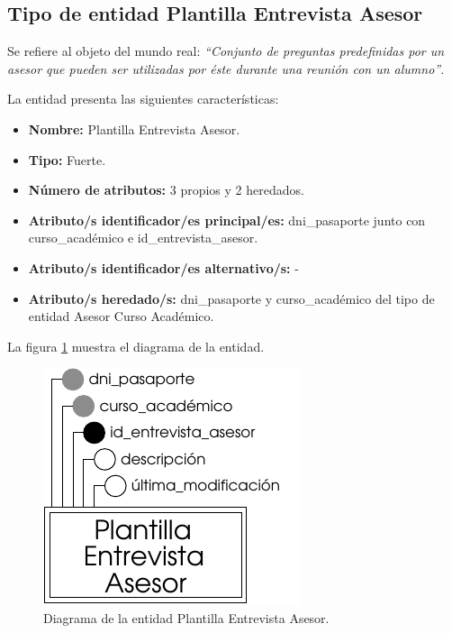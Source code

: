 \subsection{Tipo de entidad Plantilla Entrevista Asesor}

   \begin{description}

   \item[Definición] Se refiere al objeto del mundo real: \emph{``Conjunto de
   preguntas predefinidas por un asesor que pueden ser utilizadas por éste
   durante una reunión con un alumno''}.

   \item[Características] La entidad presenta las siguientes características:
      \begin{itemize}
         \item \textbf{Nombre:} Plantilla Entrevista Asesor.
         \item \textbf{Tipo:} Fuerte.
         \item \textbf{Número de atributos:} 3 propios y 2 heredados.
         \item \textbf{Atributo/s identificador/es principal/es:} dni\_pasaporte
         junto con curso\_académico e id\_entrevista\_asesor.
         \item \textbf{Atributo/s identificador/es alternativo/s:} -
         \item \textbf{Atributo/s heredado/s:} dni\_pasaporte y curso\_académico
         del tipo de entidad Asesor Curso Académico.
      \end{itemize}

   \item[Diagrama] La figura \ref{diagramaPlantEntAse} muestra el diagrama de la entidad.
   \item \begin{figure}[!ht]
            \begin{center}
            \includegraphics[]{07.Modelo_Entidad-Interrelacion/7.2.Analisis_Entidades/diagramas/plant_ent_ase.pdf}
            \caption{Diagrama de la entidad Plantilla Entrevista Asesor.}
            \label{diagramaPlantEntAse}
            \end{center}
         \end{figure}


\end{description}
